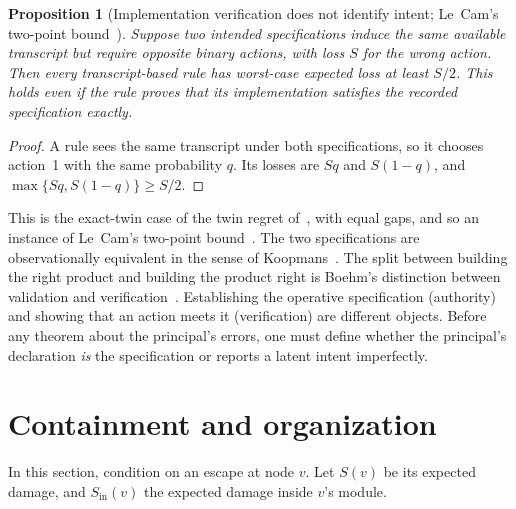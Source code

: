 \documentclass[11pt]{article}
\newtheorem{proposition}[theorem]{Proposition}
\theoremstyle{definition}
\theoremstyle{remark}
\begin{document}
\begin{proposition}[Implementation verification does not identify intent; Le~Cam's two-point
bound~\cite{lecam73}]\label{prop:intent}
Suppose two intended specifications induce the same available transcript but require opposite binary
actions, with loss $S$ for the wrong action. Then every transcript-based rule has worst-case expected
loss at least $S/2$. This holds even if the rule proves that its implementation satisfies the recorded
specification exactly.
\end{proposition}
\begin{proof}
A rule sees the same transcript under both specifications, so it chooses action~1 with the same
probability $q$. Its losses are $Sq$ and $S(1-q)$, and $\max\{Sq,S(1-q)\}\ge S/2$.
\end{proof}
This is the exact-twin case of the twin regret of~\cite{p6}, with equal gaps, and so an instance of
Le~Cam's two-point bound~\cite{lecam73}. The two specifications are observationally equivalent in
the sense of Koopmans~\cite{koopmans49}.
The split between building the right product and building the product right is Boehm's distinction
between validation and verification~\cite{boehm84}.
Establishing the operative specification (authority) and showing that an action meets it
(verification) are different objects. Before any theorem about the principal's errors, one must
define whether the principal's declaration \emph{is} the specification or reports a latent intent
imperfectly.

\section{Containment and organization}\label{sec:containment}
In this section, condition on an escape at node $v$. Let $S(v)$ be its expected damage, and
$S_{\mathrm{in}}(v)$ the expected damage inside $v$'s module.
\end{document}
